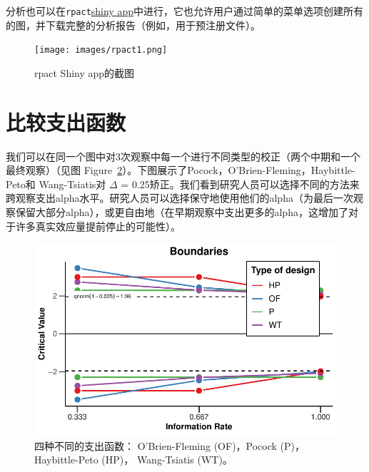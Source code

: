 \documentclass[
  letterpaper,
  DIV=11,
  numbers=noendperiod]{scrreprt}
\begin{document}
分析也可以在\texttt{rpact}\href{https://rpact.shinyapps.io/public/}{shiny
app}中进行，它也允许用户通过简单的菜单选项创建所有的图，并下载完整的分析报告（例如，用于预注册文件）。

\begin{figure}

{\centering \texttt{[image: images/rpact1.png]}

}

\caption{\label{fig-rpactshiny}rpact Shiny app的截图}

\end{figure}

\hypertarget{ux6bd4ux8f83ux652fux51faux51fdux6570}{%
\section{比较支出函数}\label{ux6bd4ux8f83ux652fux51faux51fdux6570}}

我们可以在同一个图中对3次观察中每一个进行不同类型的校正（两个中期和一个最终观察）（见图
Figure~\ref{fig-fourspendingfunctions}）。下图展示了Pocock，O'Brien-Fleming，Haybittle-Peto和
Wang-Tsiatis对 \(\Delta\) =
0.25矫正。我们看到研究人员可以选择不同的方法来跨观察支出alpha水平。研究人员可以选择保守地使用他们的alpha（为最后一次观察保留大部分alpha），或更自由地（在早期观察中支出更多的alpha，这增加了对于许多真实效应量提前停止的可能性）。

\begin{figure}

{\centering \includegraphics[width=1\textwidth,height=\textheight]{10-sequential_files/figure-pdf/fig-fourspendingfunctions-1.pdf}

}

\caption{\label{fig-fourspendingfunctions}四种不同的支出函数：
O'Brien-Fleming (OF)，Pocock (P)，Haybittle-Peto (HP)， Wang-Tsiatis
(WT)。}

\end{figure}
\end{document}
